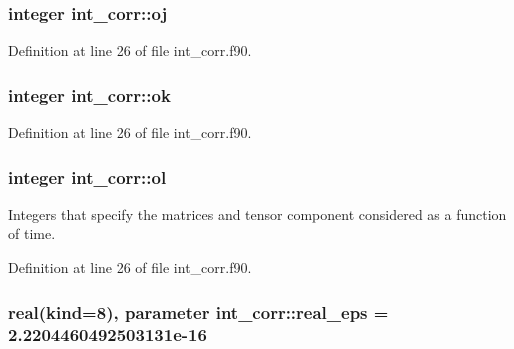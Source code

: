 \subsubsection[{\texorpdfstring{oj}{oj}}]{\setlength{\rightskip}{0pt plus 5cm}integer int\+\_\+corr\+::oj\hspace{0.3cm}{\ttfamily [private]}}\hypertarget{namespaceint__corr_a114182df2066db340a9c42d9edd1583e}{}\label{namespaceint__corr_a114182df2066db340a9c42d9edd1583e}


Definition at line 26 of file int\+\_\+corr.\+f90.

\subsubsection[{\texorpdfstring{ok}{ok}}]{\setlength{\rightskip}{0pt plus 5cm}integer int\+\_\+corr\+::ok\hspace{0.3cm}{\ttfamily [private]}}\hypertarget{namespaceint__corr_a4af4666df7c0f30de448d09ae160caf4}{}\label{namespaceint__corr_a4af4666df7c0f30de448d09ae160caf4}


Definition at line 26 of file int\+\_\+corr.\+f90.

\subsubsection[{\texorpdfstring{ol}{ol}}]{\setlength{\rightskip}{0pt plus 5cm}integer int\+\_\+corr\+::ol\hspace{0.3cm}{\ttfamily [private]}}\hypertarget{namespaceint__corr_a3fe0c6bccf317d65552767f983f1cb62}{}\label{namespaceint__corr_a3fe0c6bccf317d65552767f983f1cb62}


Integers that specify the matrices and tensor component considered as a function of time. 



Definition at line 26 of file int\+\_\+corr.\+f90.

\subsubsection[{\texorpdfstring{real\+\_\+eps}{real_eps}}]{\setlength{\rightskip}{0pt plus 5cm}real(kind=8), parameter int\+\_\+corr\+::real\+\_\+eps = 2.\+2204460492503131e-\/16\hspace{0.3cm}{\ttfamily [private]}}\hypertarget{namespaceint__corr_ab379731156e2a2dd2d0b11766d766a85}{}\label{namespaceint__corr_ab379731156e2a2dd2d0b11766d766a85}


